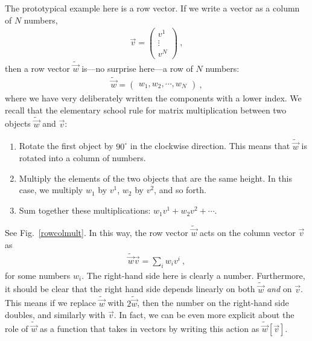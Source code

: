 \documentclass[
  11pt,
	colorful,
	raggedright,
]{tufte-style-thesis-flip}
\begin{document}
The prototypical example here is a row vector. If we write a vector as a column of $N$ numbers,
\begin{align}
   \vec v = 
   \begin{pmatrix}
     v^1 \\
     \vdots \\
     v^N
   \end{pmatrix} \ ,
 \end{align}
 then a row vector $\tilde{\vec w}$ is---no surprise here---a row of $N$ numbers:
\begin{align}
  \tilde{\vec w} = 
  \begin{pmatrix}
    w_1, w_2, \cdots, w_N
  \end{pmatrix}\ ,
\end{align}
where we have very deliberately written the components with a lower index. We recall that the elementary school rule for matrix multiplication between two objects $\tilde{\vec w}$ and $\vec v$:
\begin{enumerate}
  \item Rotate the first object by $90^\circ$ in the clockwise direction. This means that $\tilde{\vec w}$ is rotated into a column of numbers.
  \item Multiply the elements of the two objects that are the same height. In this case, we multiply $w_1$ by $v^1$, $w_2$ by $v^2$, and so forth. 
  \item Sum together these multiplications: $w_1v^1 + w_2v^2 + \cdots$.
\end{enumerate}
See Fig.~\ref{rowcolmult}.
%
In this way, the row vector $\tilde{\vec w}$ acts on the column vector $\vec v$ as
\begin{align}
  \tilde{\vec w} \vec v = \sum_i w_iv^i \ ,
  \label{eq:dual:vec:act:on:vec}
\end{align}
for some numbers $w_i$. The right-hand side here is clearly a number. Furthermore, it should be clear that the right hand side depends linearly on both $\tilde{\vec w}$ \emph{and} on $\vec v$. This means if we replace $\tilde{\vec w}$ with $2 \tilde{\vec w}$, then the number on the right-hand side doubles, and similarly with $\vec v$. In fact, we can be even more explicit about the role of $\tilde{\vec w}$ as a function that takes in vectors by writing this action as $\tilde{\vec w}[\vec v]$.
\end{document}
